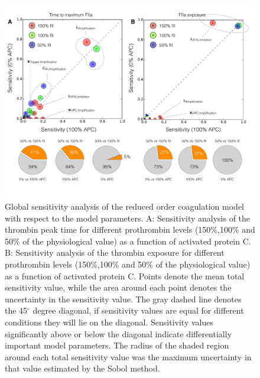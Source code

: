 \documentclass[12pt]{article}
\begin{document}
\begin{figure}
\centering
\includegraphics[width=1.0\textwidth]{./figs/Figure-9-Sensitivity.pdf}
\caption{Global sensitivity analysis of the reduced order coagulation model with respect to the model parameters.
A: Sensitivity analysis of the thrombin peak time for different prothrombin levels (150\%,100\% and 50\% of the physiological value) as a function of activated protein C. 
B: Sensitivity analysis of the thrombin exposure for different prothrombin levels (150\%,100\% and 50\% of the physiological value) as a function of activated protein C. 
Points denote the mean total sensitivity value, while the area around each point denotes the uncertainty in the sensitivity value. 
The gray dashed line denotes the 45$^{\circ}$ degree diagonal, if sensitivity values are equal for different conditions they will lie on the diagonal.  
Sensitivity values significantly above or below the diagonal indicate differentially important model parameters. 
The radius of the shaded region around each total sensitivity value was the maximum uncertainty in that value estimated by the Sobol method. 
}\label{fig-sensitivity}
\end{figure}

\clearpage

\renewcommand\thefigure{S\arabic{figure}}
\renewcommand\thetable{T\arabic{table}}
\renewcommand\thepage{S-\arabic{page}}
\renewcommand\theequation{S\arabic{equation}}

\setcounter{equation}{0}
\setcounter{table}{0}
\setcounter{figure}{0}
\setcounter{page}{1}
\end{document}
